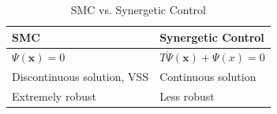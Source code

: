 \documentclass[a4paper]{report}
\begin{document}
\begin{table}[H]
    \centering
    \caption{SMC vs. Synergetic Control}
    \label{tab:smc-synergetic}
    \begin{tabularx}{0.8\textwidth}{X X}
	\toprule
	SMC & Synergetic Control \\
	\midrule
	$\Psi(\bm{x}) = 0 $ & $T \dot{\Psi}(\bm{x}) + \Psi(x) = 0$ \\
	Discontinuous solution, VSS & Continuous solution \\
	Extremely robust & Less robust \\
	\bottomrule
    \end{tabularx}
\end{table}
\end{document}
